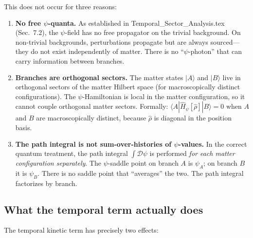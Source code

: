 \documentclass[12pt,a4paper]{article}
\begin{document}
This does not occur for three reasons:

\begin{enumerate}
\item \textbf{No free $\psi$-quanta.} As established in
Temporal\_Sector\_Analysis.tex (Sec.~7.2), the $\psi$-field has no free
propagator on the trivial background. On non-trivial backgrounds,
perturbations propagate but are always sourced---they do not exist
independently of matter. There is no ``$\psi$-photon'' that can carry
information between branches.

\item \textbf{Branches are orthogonal sectors.} The matter states
$|A\rangle$ and $|B\rangle$ live in orthogonal sectors of the matter
Hilbert space (for macroscopically distinct configurations). The
$\psi$-Hamiltonian is local in the matter configuration, so it cannot
couple orthogonal matter sectors. Formally:
$\langle A|\hat{H}_\psi[\hat\rho]|B\rangle = 0$ when $A$ and $B$ are
macroscopically distinct, because $\hat\rho$ is diagonal in the position
basis.

\item \textbf{The path integral is not sum-over-histories of
$\psi$-values.} In the correct quantum treatment, the path integral
$\int\mathcal{D}\psi$ is performed \emph{for each matter configuration
separately}. The $\psi$-saddle point on branch $A$ is $\psi_A$; on
branch $B$ it is $\psi_B$. There is no saddle point that ``averages''
the two. The path integral factorizes by branch.
\end{enumerate}

\subsection{What the temporal term actually does}

The temporal kinetic term has precisely two effects:
\end{document}
